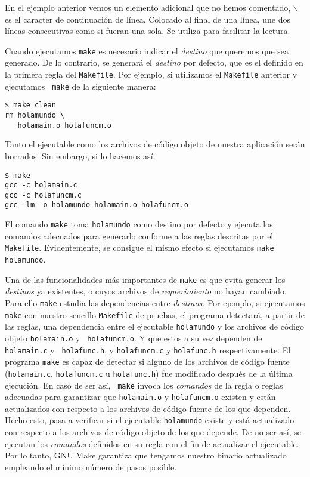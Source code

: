 En el ejemplo anterior vemos un elemento adicional que no hemos
comentado, {\tt $\backslash$} es el caracter de continuación de línea.
Colocado al final de una línea, une dos líneas consecutivas como si
fueran una sola. Se utiliza para facilitar la lectura.

Cuando ejecutamos {\tt make} es necesario indicar el {\em destino} que
queremos que sea generado. De lo contrario, se generará el {\em destino}
por defecto, que es el definido en la primera regla del {\tt Makefile}.
Por ejemplo, si utilizamos el {\tt Makefile} anterior y ejecutamos {\tt
make} de la siguiente manera:

\begin{verbatim}
$ make clean
rm holamundo \
   holamain.o holafuncm.o
\end{verbatim}

Tanto el ejecutable como los archivos de código objeto de nuestra
aplicación serán borrados. Sin embargo, si lo hacemos así:

\begin{verbatim}
$ make
gcc -c holamain.c
gcc -c holafuncm.c
gcc -lm -o holamundo holamain.o holafuncm.o
\end{verbatim}

El comando {\tt make} toma {\tt holamundo} como destino por defecto y
ejecuta los comandos adecuados para generarlo conforme a las reglas
descritas por el {\tt Makefile}. Evidentemente, se consigue el mismo
efecto si ejecutamos {\tt make holamundo}.

Una de las funcionalidades más importantes de {\tt make} es que evita
generar los {\em destinos} ya existentes, o cuyos archivos de {\em
requerimiento} no hayan cambiado. Para ello {\tt make} estudia las
dependencias entre {\em destinos}. Por ejemplo, si ejecutamos {\tt
make} con nuestro sencillo {\tt Makefile} de pruebas, el programa
detectará, a partir de las reglas, una dependencia entre el ejecutable
{\tt holamundo} y los archivos de código objeto {\tt holamain.o} y {\tt
holafuncm.o}. Y que estos a su vez dependen de {\tt holamain.c} y {\tt
holafunc.h}, y {\tt holafuncm.c} y {\tt holafunc.h} respectivamente. El
programa {\tt make} es capaz de detectar si alguno de los archivos de
código fuente ({\tt holamain.c}, {\tt holafuncm.c} u {\tt holafunc.h})
fue modificado después de la última ejecución. En caso de ser así, {\tt
make} invoca los {\em comandos} de la regla o reglas adecuadas para
garantizar que {\tt holamain.o} y {\tt holafuncm.o} existen y están
actualizados con respecto a los archivos de código fuente de los que
dependen. Hecho esto, pasa a verificar si el ejecutable {\tt holamundo}
existe y está actualizado con respecto a los archivos de código objeto
de los que depende. De no ser así, se ejecutan los {\em comandos}
definidos en su regla con el fin de actualizar el ejecutable. Por lo
tanto, {\sf GNU Make} garantiza que tengamos nuestro binario actualizado
empleando el mínimo número de pasos posible.

